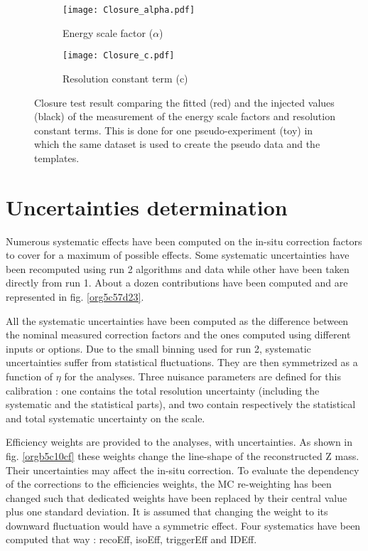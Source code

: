 \begin{figure}
\begin{subfigure}[t]{0.49\linewidth}
\begin{center}
\texttt{[image: Closure\_alpha.pdf]}
\end{center}
\caption{Energy scale factor (\(\alpha\))}
\end{subfigure}
\begin{subfigure}[t]{0.49\linewidth}
\begin{center}
\texttt{[image: Closure\_c.pdf]}
\end{center}
\caption{Resolution constant term (c)}
\end{subfigure}
\caption{\label{org3e85744}
Closure test result comparing the fitted (red) and the injected values (black) of the measurement of the energy scale factors and resolution constant terms. This is done for one pseudo-experiment (toy) in which the same dataset is used to create the pseudo data and the templates.}
\end{figure}


\section{Uncertainties determination}
\label{sec:org2bc2b1f}
\label{sec:Calibration_inSituUncertainties}

Numerous systematic effects have been computed on the in-situ correction factors to cover for a maximum of possible effects.
Some systematic uncertainties have been recomputed using run 2 algorithms and data while other have been taken directly from run 1.
About a dozen contributions have been computed and are represented in fig. \ref{org5c57d23}.

All the systematic uncertainties have been computed as the difference between the nominal measured correction factors and the ones computed using different inputs or options.
Due to the small binning used for run 2, systematic uncertainties suffer from statistical fluctuations.
They are then symmetrized as a function of $\eta$ for the analyses.
Three nuisance parameters are defined for this calibration : one contains the total resolution uncertainty (including the systematic and the statistical parts), and two contain respectively the statistical and total systematic uncertainty on the scale.

Efficiency weights are provided to the analyses, with uncertainties.
As shown in fig. \ref{orgb5c10cf} these weights change the line-shape of the reconstructed Z mass.
Their uncertainties may affect the in-situ correction.
To evaluate the dependency of the corrections to the efficiencies weights, the MC re-weighting has been changed such that dedicated weights have been replaced by their central value plus one standard deviation.
It is assumed that changing the weight to its downward fluctuation would have a symmetric effect.
Four systematics have been computed that way : recoEff, isoEff, triggerEff and IDEff.

